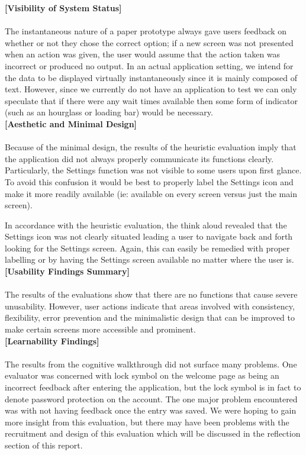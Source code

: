 \documentclass[pdftex,12pt,a4paper]{report}
\begin{document}
\noindent\textbf{[Visibility of System Status]}\\\\
The instantaneous nature of a paper prototype always gave users feedback on whether or not they chose the correct option; if a new screen was not presented when an action was given, the user would assume that the action taken was incorrect or produced no output. In an actual application setting, we intend for the data to be displayed virtually instantaneously since it is mainly composed of text. However, since we currently do not have an application to test we can only speculate that if there were any wait times available then some form of indicator (such as an hourglass or loading bar) would be necessary.\\

\noindent\textbf{[Aesthetic and Minimal Design]}\\\\
Because of the minimal design, the results of the heuristic evaluation imply that the application did not always properly communicate its functions clearly. Particularly, the Settings function was not visible to some users upon first glance. To avoid this confusion it would be best to properly label the Settings icon and make it more readily available (ie: available on every screen versus just the main screen).

In accordance with the heuristic evaluation, the think aloud revealed that the Settings icon was not clearly situated leading a user to navigate back and forth looking for the Settings screen. Again, this can easily be remedied with proper labelling or by having the Settings screen available no matter where the user is.\\

\noindent\textbf{[Usability Findings Summary]}\\\\
The results of the evaluations show that there are no functions that cause severe unusability. However, user actions indicate that areas involved with consistency, flexibility, error prevention and the minimalistic design that can be improved to make certain screens more accessible and prominent.\\

\noindent\textbf{[Learnability Findings]}\\\\
The results from the cognitive walkthrough did not surface many problems. One evaluator was concerned with lock symbol on the welcome page as being an incorrect feedback after entering the application, but the lock symbol is in fact to denote password protection on the account. The one major problem encountered was with not having feedback once the entry was saved. We were hoping to gain more insight from this evaluation, but there may have been problems with the recruitment and design of this evaluation which will be discussed in the reflection section of this report.
\end{document}
